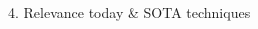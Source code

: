 \begin{frame}[t]
\begin{columns}[t,totalwidth=\textwidth]
\begin{column}{0.33\textwidth}
\begin{block}{4. Relevance today \& SOTA techniques}
    \end{block}
  \end{column}
  
  \end{columns}
\end{frame}


